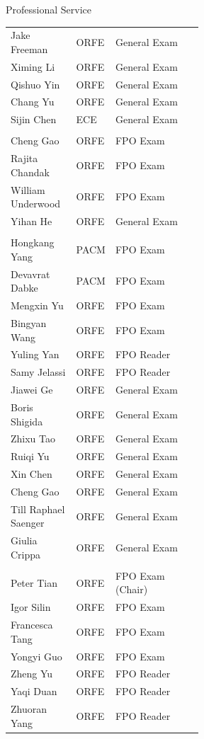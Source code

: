 \documentclass{resume}
\begin{document}
\begin{rSection}{Professional Service}
\begin{longtable}{@{}>{\raggedright\arraybackslash}p{0.34\linewidth}>{\raggedright\arraybackslash}p{0.20\linewidth}>{\raggedright\arraybackslash}p{}@{}}
Jake Freeman & ORFE & General Exam \\
Ximing Li & ORFE & General Exam \\
Qishuo Yin & ORFE & General Exam \\
Chang Yu & ORFE & General Exam \\
Sijin Chen & ECE & General Exam \\
\multicolumn{3}{@{}l}{\textbf{2024}} \\*[2pt]
Cheng Gao & ORFE & FPO Exam \\*
Rajita Chandak & ORFE & FPO Exam \\*
William Underwood & ORFE & FPO Exam \\*
Yihan He & ORFE & General Exam \\
\multicolumn{3}{@{}l}{\textbf{2023}} \\*[2pt]
Hongkang Yang & PACM & FPO Exam \\
Devavrat Dabke & PACM & FPO Exam \\
Mengxin Yu & ORFE & FPO Exam \\
Bingyan Wang & ORFE & FPO Exam \\
Yuling Yan & ORFE & FPO Reader \\
Samy Jelassi & ORFE & FPO Reader \\
Jiawei Ge & ORFE & General Exam \\
Boris Shigida & ORFE & General Exam \\
Zhixu Tao & ORFE & General Exam \\
Ruiqi Yu & ORFE & General Exam \\
Xin Chen & ORFE & General Exam \\
Cheng Gao & ORFE & General Exam \\
Till Raphael Saenger & ORFE & General Exam \\
Giulia Crippa & ORFE & General Exam \\
\multicolumn{3}{@{}l}{\textbf{2022}} \\*[2pt]
Peter Tian & ORFE & FPO Exam (Chair) \\
Igor Silin & ORFE & FPO Exam \\
Francesca Tang & ORFE & FPO Exam \\
Yongyi Guo & ORFE & FPO Exam \\
Zheng Yu & ORFE & FPO Reader \\
Yaqi Duan & ORFE & FPO Reader \\
Zhuoran Yang & ORFE & FPO Reader \\

\end{longtable}
\end{rSection}
\end{document}
